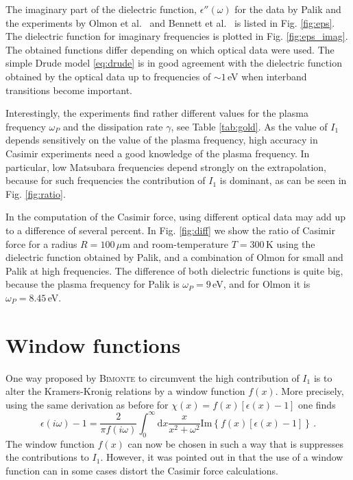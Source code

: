 \documentclass[twocolumn,superscriptaddress,pre]{revtex4-1}
\begin{document}
The imaginary part of the dielectric function, $\epsilon''(\omega)$ for the
data by Palik \cite{Palik1995} and the experiments by Olmon et al.\
\cite{Olmon2012} and Bennett et al.\ \cite{Bennett1966} is listed in Fig.
\ref{fig:eps}. The dielectric function for imaginary frequencies is plotted in
Fig. \ref{fig:eps_imag}. The obtained functions differ depending on which
optical data were used. The simple Drude model \eqref{eq:drude} is in good
agreement with the dielectric function obtained by the optical data up to
frequencies of $\sim 1\,$eV when interband transitions become important.

Interestingly, the experiments find rather different values for the plasma
frequency $\omega_P$ and the dissipation rate $\gamma$, see Table
\ref{tab:gold}. As the value of $I_1$ depends sensitively on the value of the
plasma frequency, high accuracy in Casimir experiments need a good knowledge
of the plasma frequency. In particular, low Matsubara frequencies depend
strongly on the extrapolation, because for such frequencies the contribution
of $I_1$ is dominant, as can be seen in Fig. \ref{fig:ratio}.

In the computation of the Casimir force, using different optical data may add
up to a difference of several percent. In Fig. \ref{fig:diff} we show the ratio of
Casimir force for a radius $R=100\,\mu$m and room-temperature $T=300\,$K using the
dielectric function obtained by Palik, and a combination of Olmon for small and Palik
at high frequencies. The difference of both dielectric functions is quite big, because
the plasma frequency for Palik is $\omega_P=9\,$eV, and for Olmon it is $\omega_P=8.45\,$eV.


\section{Window functions}

One way proposed by \textsc{Bimonte} \cite{Bimonte2010} to circumvent the high contribution
of $I_1$ is to alter the Kramers-Kronig relations by a window function $f(x)$. More precisely,
using the same derivation as before for $\chi(x)=f(x)[\epsilon(x)-1]$ one finds
\begin{equation}
\epsilon(i\omega)-1 = \frac{2}{\pi f(i\omega)} \int_0^\infty \mathrm{d}x \frac{x}{x^2+\omega^2} \mathrm{Im}\left\{ f(x)\left[\epsilon(x)-1\right] \right\} \,.
\end{equation}
The window function $f(x)$ can now be chosen in such a way that is suppresses
the contributions to $I_1$. However, it was pointed out in \cite{Shpak2011}
that the use of a window function can in some cases distort the Casimir force
calculations.
\end{document}
